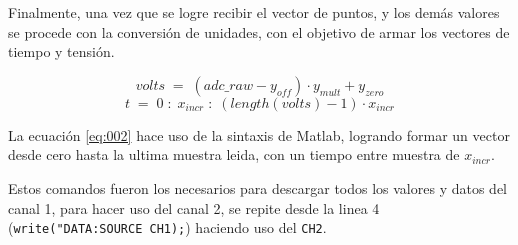 Finalmente, una vez que se logre recibir el vector de puntos, y los demás valores se procede con la conversión de unidades, con el objetivo de armar los vectores de tiempo y tensión.

\begin{equation}
	volts \;=\; (adc\_raw - y_{off}) \cdot y_{mult} + y_{zero}
	\label{eq:001}
\end{equation}
\begin{equation}
	t \;=\; 0 \;:\; x_{incr} \;:\; (length(volts) - 1) \cdot x_{incr} 
	\label{eq:002}
\end{equation}

La ecuación \ref{eq:002} hace uso de la sintaxis de Matlab, logrando formar un vector desde cero hasta la ultima muestra leida, con un tiempo entre muestra de $x_{incr}$.

Estos comandos fueron los necesarios para descargar todos los valores y datos del canal 1, para hacer uso del canal 2, se repite desde la linea 4 (\texttt{write("DATA:SOURCE CH1);}) haciendo uso del \texttt{CH2}.




